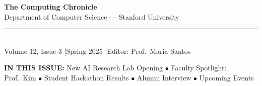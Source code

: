 \documentclass[10pt,a4paper]{article}
\begin{document}

\vspace*{-1.5cm}
\begin{center}
  {\color{white}\fontsize{36}{44}\selectfont\bfseries The Computing Chronicle}\\[6pt]
  {\color{white!80}\large Department of Computer Science --- Stanford University}\\[4pt]
  {\color{accent}\rule{6cm}{2pt}}\\[4pt]
  {\color{white!70}\small Volume 12, Issue 3 \quad|\quad Spring 2025 \quad|\quad Editor: Prof.\ Maria Santos}
\end{center}

\vspace{0.8cm}

\colorbox{lightbg}{%
\begin{minipage}{\dimexpr\textwidth-2\fboxsep}
\centering\small\color{darktext}
\textbf{IN THIS ISSUE:}\quad
New AI Research Lab Opening $\bullet$
Faculty Spotlight: Prof.\ Kim $\bullet$
Student Hackathon Results $\bullet$
Alumni Interview $\bullet$
Upcoming Events
\end{minipage}}

\vspace{0.6cm}
\end{document}

